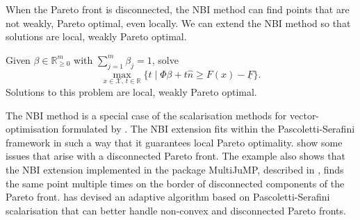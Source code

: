 \documentclass[main.tex]{subfiles}
\begin{document}
When the Pareto front is disconnected, the NBI method can find
points that are not weakly, Pareto optimal, even locally.
We can extend the NBI method so that solutions are local, weakly
Pareto optimal.
\begin{mydef}
  Given $\beta\in\mathbb{R}_{\geq 0}^m$ with $\sum_{j=1}^m\beta_j=1$,
  solve
  \begin{equation}
    \max_{x\in\mathcal{X},\,t\in\mathbb{R}} \{t \mid \Phi\beta +
    t\hat{n} \geq F(x) - \underline{F}\}.
  \end{equation}
  Solutions to this problem are local, weakly Pareto optimal.
\end{mydef}

The NBI method is a special case of the scalarisation methods for
vector-optimisation formulated by
\citet{pascoletti1984scalarizing}. The NBI extension fits within the
Pascoletti-Serafini framework in such a way that it guarantees local
Pareto optimality.  show some issues that
arise with a disconnected Pareto front.  The example also shows that
the NBI extension implemented in the package MultiJuMP, described in
, finds the same point multiple times on the
border of disconnected components of the Pareto front.
\citet{eichfelder2009adaptive} has devised an adaptive algorithm based
on Pascoletti-Serafini scalarisation that can better handle non-convex
and disconnected Pareto fronts.
\end{document}
